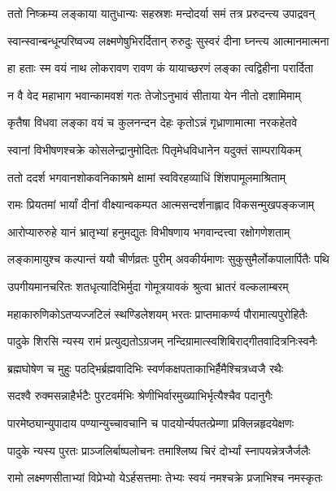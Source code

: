 \twolineshloka
{ततो निष्क्रम्य लङ्काया यातुधान्यः सहस्रशः}
{मन्दोदर्या समं तत्र प्ररुदन्त्य उपाद्रवन्} %

\twolineshloka
{स्वान्स्वान्बन्धून्परिष्वज्य लक्ष्मणेषुभिरर्दितान्}
{रुरुदुः सुस्वरं दीना घ्नन्त्य आत्मानमात्मना} %

\twolineshloka
{हा हताः स्म वयं नाथ लोकरावण रावण}
{कं यायाच्छरणं लङ्का त्वद्विहीना परार्दिता} %

\twolineshloka
{न वै वेद महाभाग भवान्कामवशं गतः}
{तेजोऽनुभावं सीताया येन नीतो दशामिमाम्} %

\twolineshloka
{कृतैषा विधवा लङ्का वयं च कुलनन्दन}
{देहः कृतोऽन्नं गृध्राणामात्मा नरकहेतवे} %


\twolineshloka
{स्वानां विभीषणश्चक्रे कोसलेन्द्रानुमोदितः}
{पितृमेधविधानेन यदुक्तं साम्परायिकम्} %

\twolineshloka
{ततो ददर्श भगवानशोकवनिकाश्रमे}
{क्षामां स्वविरहव्याधिं शिंशपामूलमाश्रिताम्} %

\twolineshloka
{रामः प्रियतमां भार्यां दीनां वीक्ष्यान्वकम्पत}
{आत्मसन्दर्शनाह्लाद विकसन्मुखपङ्कजाम्} %

\twolineshloka
{आरोप्यारुरुहे यानं भ्रातृभ्यां हनुमद्युतः}
{विभीषणाय भगवान्दत्त्वा रक्षोगणेशताम्} %

\twolineshloka
{लङ्कामायुश्च कल्पान्तं ययौ चीर्णव्रतः पुरीम्}
{अवकीर्यमाणः सुकुसुमैर्लोकपालार्पितैः पथि} %

\twolineshloka
{उपगीयमानचरितः शतधृत्यादिभिर्मुदा}
{गोमूत्रयावकं श्रुत्वा भ्रातरं वल्कलाम्बरम्} %

\twolineshloka
{महाकारुणिकोऽतप्यज्जटिलं स्थण्डिलेशयम्}
{भरतः प्राप्तमाकर्ण्य पौरामात्यपुरोहितैः} %

\twolineshloka
{पादुके शिरसि न्यस्य रामं प्रत्युद्यतोऽग्रजम्}
{नन्दिग्रामात्स्वशिबिराद्गीतवादित्रनिःस्वनैः} %

\twolineshloka
{ब्रह्मघोषेण च मुहुः पठद्भिर्ब्रह्मवादिभिः}
{स्वर्णकक्षपताकाभिर्हैमैश्चित्रध्वजै रथैः} %

\twolineshloka
{सदश्वै रुक्मसन्नाहैर्भटैः पुरटवर्मभिः}
{श्रेणीभिर्वारमुख्याभिर्भृत्यैश्चैव पदानुगैः} %

\twolineshloka
{पारमेष्ठ्यान्युपादाय पण्यान्युच्चावचानि च}
{पादयोर्न्यपतत्प्रेम्णा प्रक्लिन्नहृदयेक्षणः} %

\twolineshloka
{पादुके न्यस्य पुरतः प्राञ्जलिर्बाष्पलोचनः}
{तमाश्लिष्य चिरं दोर्भ्यां स्नापयन्नेत्रजैर्जलैः} %

\twolineshloka
{रामो लक्ष्मणसीताभ्यां विप्रेभ्यो येऽर्हसत्तमाः}
{तेभ्यः स्वयं नमश्चक्रे प्रजाभिश्च नमस्कृतः} %

